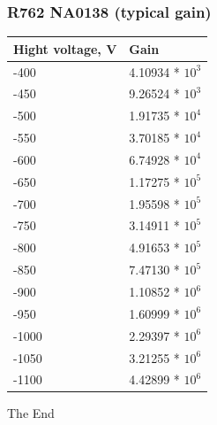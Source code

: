 \documentclass{beamer}
\begin{document}
\begin{frame}
\frametitle{R762 NA0138 (typical gain)}
\begin{table}
\begin{tabular}{l l}
\toprule
\textbf{Hight voltage, V} & \textbf{Gain} \\
\midrule
-400  &  4.10934 * $10^3$\\
-450  &  9.26524 * $10^3$\\
-500  &  1.91735 * $10^4$\\
-550  &  3.70185 * $10^4$\\
-600  &  6.74928 * $10^4$\\
-650  &  1.17275 * $10^5$\\
-700  &  1.95598 * $10^5$\\
-750  &  3.14911 * $10^5$\\
-800  &  4.91653 * $10^5$\\
-850  &  7.47130 * $10^5$\\
-900  &  1.10852 * $10^6$\\
-950  &  1.60999 * $10^6$\\
-1000 &  2.29397 * $10^6$\\
-1050 &  3.21255 * $10^6$\\
-1100 &  4.42899 * $10^6$\\
\bottomrule
\end{tabular}
\end{table}
\end{frame}


\begin{frame}
\Huge{\centerline{The End}}
\end{frame}

\end{document}
